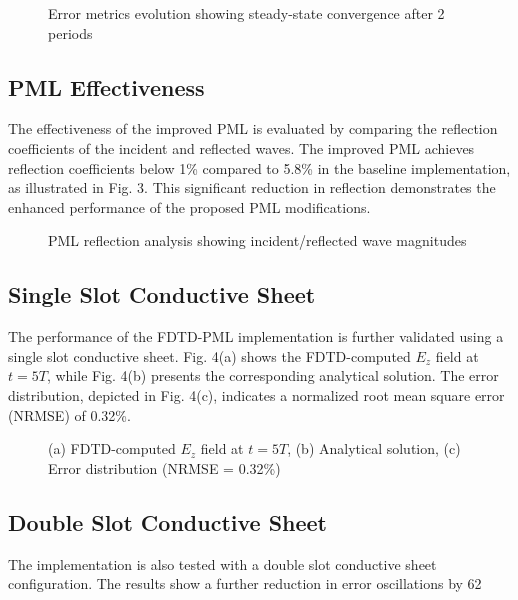 \documentclass[journal]{IEEEtran}
\begin{document}
\begin{figure}[htbp]
\centering
\caption{Error metrics evolution showing steady-state convergence after 2 periods}
\end{figure}

\subsection{PML Effectiveness}
The effectiveness of the improved PML is evaluated by comparing the reflection coefficients of the incident and reflected waves. The improved PML achieves reflection coefficients below 1\% compared to 5.8\% in the baseline implementation, as illustrated in Fig. 3. This significant reduction in reflection demonstrates the enhanced performance of the proposed PML modifications.

\begin{figure}[htbp]
\centering
\caption{PML reflection analysis showing incident/reflected wave magnitudes}
\end{figure}

\subsection{Single Slot Conductive Sheet}
The performance of the FDTD-PML implementation is further validated using a single slot conductive sheet. Fig. 4(a) shows the FDTD-computed $E_z$ field at $t=5T$, while Fig. 4(b) presents the corresponding analytical solution. The error distribution, depicted in Fig. 4(c), indicates a normalized root mean square error (NRMSE) of 0.32\%.

\begin{figure}[htbp]
\centering
\caption{(a) FDTD-computed $E_z$ field at $t=5T$, (b) Analytical solution, (c) Error distribution (NRMSE = 0.32\%)}
\end{figure}

\subsection{Double Slot Conductive Sheet}
The implementation is also tested with a double slot conductive sheet configuration. The results show a further reduction in error oscillations by 62%
\end{document}
